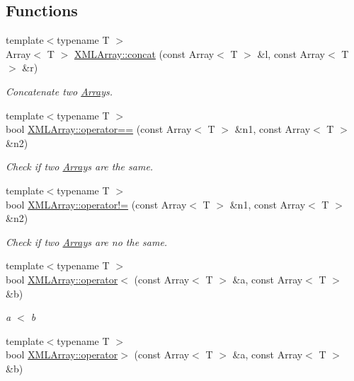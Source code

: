 \subsection*{Functions}
\begin{DoxyCompactItemize}
\item 
{\footnotesize template$<$typename T $>$ }\\Array$<$ T $>$ \mbox{\hyperlink{namespaceXMLArray_af16029dd462356447ca4c8264203335a}{X\+M\+L\+Array\+::concat}} (const Array$<$ T $>$ \&l, const Array$<$ T $>$ \&r)
\begin{DoxyCompactList}\small\item\em Concatenate two \mbox{\hyperlink{classXMLArray_1_1Array}{Array}}\textquotesingle{}s. \end{DoxyCompactList}\item 
{\footnotesize template$<$typename T $>$ }\\bool \mbox{\hyperlink{namespaceXMLArray_a832b56f8c7a9d6415cadd0d6e60635f1}{X\+M\+L\+Array\+::operator==}} (const Array$<$ T $>$ \&n1, const Array$<$ T $>$ \&n2)
\begin{DoxyCompactList}\small\item\em Check if two \mbox{\hyperlink{classXMLArray_1_1Array}{Array}}\textquotesingle{}s are the same. \end{DoxyCompactList}\item 
{\footnotesize template$<$typename T $>$ }\\bool \mbox{\hyperlink{namespaceXMLArray_a1cfa3f5a98b382e585af567e51479053}{X\+M\+L\+Array\+::operator!=}} (const Array$<$ T $>$ \&n1, const Array$<$ T $>$ \&n2)
\begin{DoxyCompactList}\small\item\em Check if two \mbox{\hyperlink{classXMLArray_1_1Array}{Array}}\textquotesingle{}s are no the same. \end{DoxyCompactList}\item 
{\footnotesize template$<$typename T $>$ }\\bool \mbox{\hyperlink{namespaceXMLArray_a6cdc9d50a3fbbd96cfbbef4bbaf78fa4}{X\+M\+L\+Array\+::operator$<$}} (const Array$<$ T $>$ \&a, const Array$<$ T $>$ \&b)
\begin{DoxyCompactList}\small\item\em a $<$ b \end{DoxyCompactList}\item 
{\footnotesize template$<$typename T $>$ }\\bool \mbox{\hyperlink{namespaceXMLArray_ad9684cbf7b3089e446a523042d2818c1}{X\+M\+L\+Array\+::operator$>$}} (const Array$<$ T $>$ \&a, const Array$<$ T $>$ \&b)

\end{DoxyCompactItemize}
